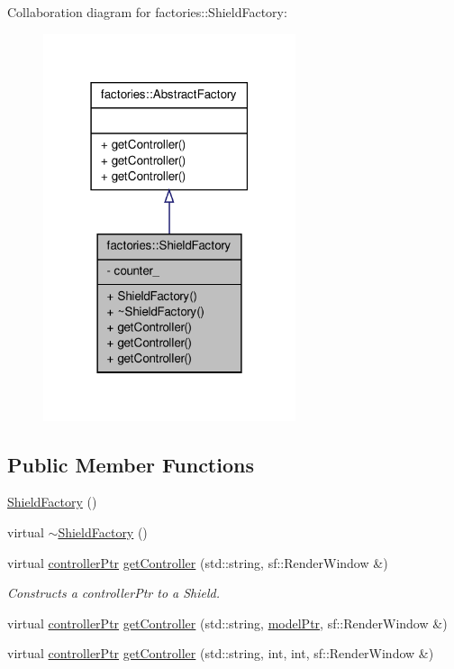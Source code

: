 \-Collaboration diagram for factories\-:\-:\-Shield\-Factory\-:
\nopagebreak
\begin{figure}[H]
\begin{center}
\leavevmode
\includegraphics[width=210pt]{d2/d57/classfactories_1_1ShieldFactory__coll__graph}
\end{center}
\end{figure}
\subsection*{\-Public \-Member \-Functions}
\begin{DoxyCompactItemize}
\item 
\hyperlink{classfactories_1_1ShieldFactory_a871347e84fb1b0ed8c10049c7dd3fe99}{\-Shield\-Factory} ()
\item 
virtual \hyperlink{classfactories_1_1ShieldFactory_afe2d2a980b7b6a5394002bccf0d0a48e}{$\sim$\-Shield\-Factory} ()
\item 
virtual \hyperlink{Game_8h_a21b04f6cf2d5990b82725fac5ea2ce9a}{controller\-Ptr} \hyperlink{classfactories_1_1ShieldFactory_a8ec2da410cee03d34aa3e4d8e5c0e8c3}{get\-Controller} (std\-::string, sf\-::\-Render\-Window \&)
\begin{DoxyCompactList}\small\item\em \-Constructs a controller\-Ptr to a \-Shield. \end{DoxyCompactList}\item 
virtual \hyperlink{Game_8h_a21b04f6cf2d5990b82725fac5ea2ce9a}{controller\-Ptr} \hyperlink{classfactories_1_1ShieldFactory_a688218f74bbc39c377184ff7b27c268a}{get\-Controller} (std\-::string, \hyperlink{ModelView_8h_a78966ddb517fca8d2b29a2bc5c31e74e}{model\-Ptr}, sf\-::\-Render\-Window \&)
\item 
virtual \hyperlink{Game_8h_a21b04f6cf2d5990b82725fac5ea2ce9a}{controller\-Ptr} \hyperlink{classfactories_1_1ShieldFactory_a805b6a1bdb8356dca649419b4bd61d9e}{get\-Controller} (std\-::string, int, int, sf\-::\-Render\-Window \&)
\end{DoxyCompactItemize}
